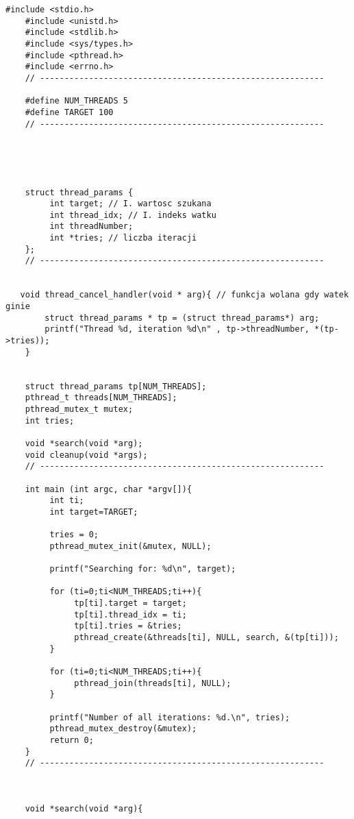 \documentclass[a4paper,15pt]{article}
\begin{document}
\begin{lstlisting}[style=CStyle, label=some-code, caption=Zadanie 5 - randomsearch.c]
#include <stdio.h>
    #include <unistd.h>
    #include <stdlib.h>
    #include <sys/types.h>
    #include <pthread.h>
    #include <errno.h>
    // ----------------------------------------------------------
     
    #define NUM_THREADS 5
    #define TARGET 100
    // ----------------------------------------------------------
     

  


    struct thread_params {
         int target; // I. wartosc szukana
         int thread_idx; // I. indeks watku
         int threadNumber;
         int *tries; // liczba iteracji
    };
    // ----------------------------------------------------------


   void thread_cancel_handler(void * arg){ // funkcja wolana gdy watek ginie
        struct thread_params * tp = (struct thread_params*) arg;
        printf("Thread %d, iteration %d\n" , tp->threadNumber, *(tp->tries));
    }

     
    struct thread_params tp[NUM_THREADS];
    pthread_t threads[NUM_THREADS];
    pthread_mutex_t mutex;
    int tries;
     
    void *search(void *arg);
    void cleanup(void *args);
    // ----------------------------------------------------------
     
    int main (int argc, char *argv[]){
         int ti;
         int target=TARGET;
     
         tries = 0;
         pthread_mutex_init(&mutex, NULL); 
     
         printf("Searching for: %d\n", target);
     
         for (ti=0;ti<NUM_THREADS;ti++){
              tp[ti].target = target;
              tp[ti].thread_idx = ti;
              tp[ti].tries = &tries;
              pthread_create(&threads[ti], NULL, search, &(tp[ti]));
         }
     
         for (ti=0;ti<NUM_THREADS;ti++){ 
              pthread_join(threads[ti], NULL);
         }
     
         printf("Number of all iterations: %d.\n", tries);
         pthread_mutex_destroy(&mutex);
         return 0;
    }
    // ----------------------------------------------------------
     
    

    void *search(void *arg){


\end{lstlisting}
\end{document}
